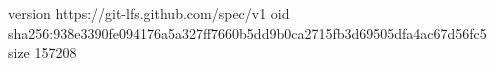 version https://git-lfs.github.com/spec/v1
oid sha256:938e3390fe094176a5a327ff7660b5dd9b0ca2715fb3d69505dfa4ac67d56fc5
size 157208
